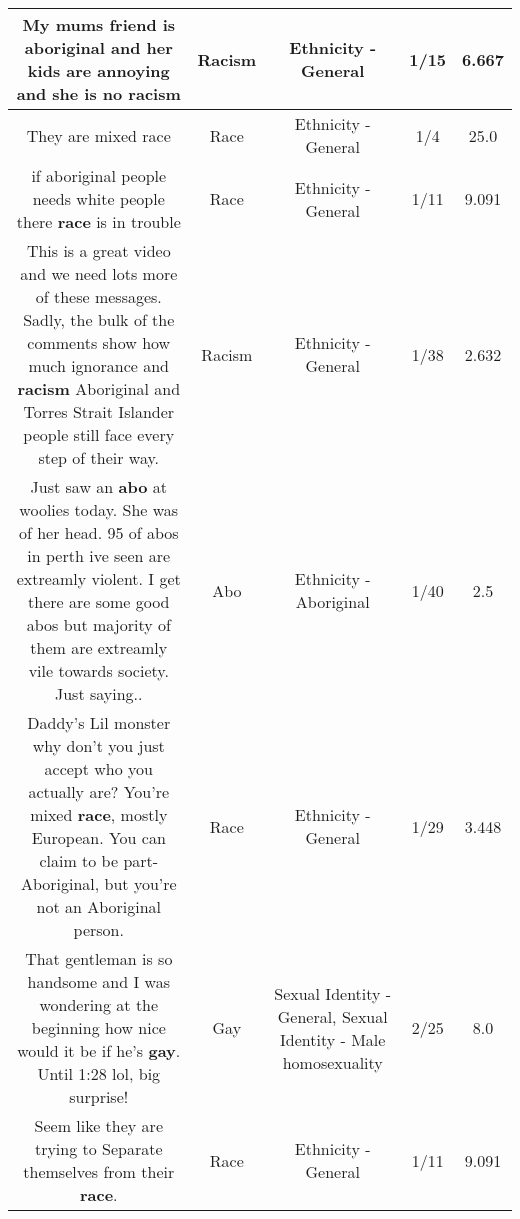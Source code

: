 \documentclass[11pt]{article}
\newlength\mylength
\begin{document}
\begin{center}
\begin{longtable}{|C{.65\mylength}|C{.30\mylength}|C{.12\mylength}|C{.12\mylength}|C{.12\mylength}|}
  \small My mums friend is aboriginal and her kids are annoying and she is no racism\normalsize   & Racism & Ethnicity - General & 1/15 & 6.667 \\  \hline
  \small They are mixed race\normalsize   & Race & Ethnicity - General & 1/4 & 25.0 \\  \hline
  \small if aboriginal people needs white people there \textbf{race} is in trouble\normalsize   & Race & Ethnicity - General & 1/11 & 9.091 \\  \hline
  \small This is a great video and we need lots more of these messages. Sadly, the bulk of the comments show how much ignorance and \textbf{racism} Aboriginal and Torres Strait Islander people still face every step of their way.\normalsize   & Racism & Ethnicity - General & 1/38 & 2.632 \\  \hline
  \small Just saw an \textbf{abo} at woolies today. She was of her head. 95 of abos in perth ive seen are extreamly violent. I get there are some good abos but majority of them are extreamly vile towards society. Just saying..\normalsize   & Abo & Ethnicity - Aboriginal & 1/40 & 2.5 \\  \hline
  \small Daddy's Lil monster why don't you just accept who you actually are? You're mixed \textbf{race}, mostly European.  You can claim to be part-Aboriginal, but you're not an Aboriginal person.\normalsize   & Race & Ethnicity - General & 1/29 & 3.448 \\  \hline
  \small That gentleman is so handsome and I was wondering at the beginning how nice would it be if he's \textbf{g\textbf{ay}}. Until 1:28 lol, big surprise!\normalsize   & Gay & Sexual Identity - General, Sexual Identity - Male homosexuality & 2/25 & 8.0 \\  \hline
  \small Seem like they are trying to Separate themselves from their \textbf{race}.\normalsize   & Race & Ethnicity - General & 1/11 & 9.091 \\  \hline

\end{longtable}
\end{center}
\end{document}

